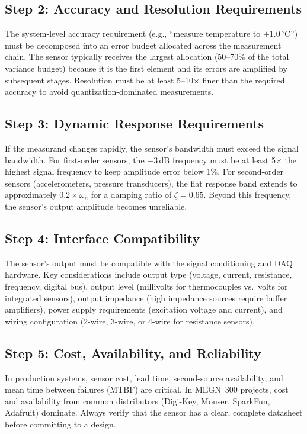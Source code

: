\documentclass[11pt,letterpaper,twoside,openany]{book}
\newcommand{\degC}{\ensuremath{{}^{\circ}\text{C}}}
\begin{document}
\subsection{Step 2: Accuracy and Resolution Requirements}
The system-level accuracy requirement (e.g., ``measure temperature to $\pm$1.0\,\degC{}'') must be decomposed into an error budget allocated across the measurement chain. The sensor typically receives the largest allocation (50--70\% of the total variance budget) because it is the first element and its errors are amplified by subsequent stages. Resolution must be at least 5--10$\times$ finer than the required accuracy to avoid quantization-dominated measurements.

\subsection{Step 3: Dynamic Response Requirements}
If the measurand changes rapidly, the sensor's bandwidth must exceed the signal bandwidth. For first-order sensors, the $-3$\,dB frequency must be at least 5$\times$ the highest signal frequency to keep amplitude error below 1\%. For second-order sensors (accelerometers, pressure transducers), the flat response band extends to approximately $0.2 \times \omega_n$ for a damping ratio of $\zeta = 0.65$. Beyond this frequency, the sensor's output amplitude becomes unreliable.

\subsection{Step 4: Interface Compatibility}
The sensor's output must be compatible with the signal conditioning and DAQ hardware. Key considerations include output type (voltage, current, resistance, frequency, digital bus), output level (millivolts for thermocouples vs.\ volts for integrated sensors), output impedance (high impedance sources require buffer amplifiers), power supply requirements (excitation voltage and current), and wiring configuration (2-wire, 3-wire, or 4-wire for resistance sensors).

\subsection{Step 5: Cost, Availability, and Reliability}
In production systems, sensor cost, lead time, second-source availability, and mean time between failures (MTBF) are critical. In MEGN~300 projects, cost and availability from common distributors (Digi-Key, Mouser, SparkFun, Adafruit) dominate. Always verify that the sensor has a clear, complete datasheet before committing to a design.
\end{document}
